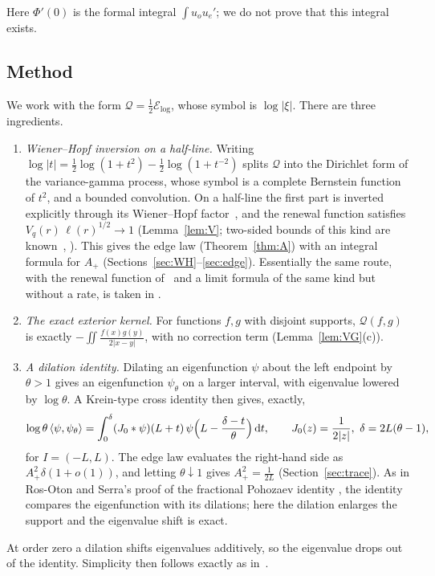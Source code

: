 \documentclass[11pt]{amsart}
\newcommand{\E}{\mathcal{E}}
\newcommand{\dd}{\,\mathrm{d}}
\theoremstyle{definition}
\theoremstyle{remark}
\numberwithin{equation}{section}
\begin{document}
Here $\Phi'(0)$ is the formal integral $\int u_ou_e'$; we do not prove that this integral exists.

\subsection{Method}
We work with the form $\mathcal Q=\frac12\E_{\log}$, whose symbol is $\log|\xi|$. There are three ingredients.
\begin{enumerate}
\item \emph{Wiener--Hopf inversion on a half-line.} Writing $\log|t|=\frac12\log(1+t^2)-\frac12\log(1+t^{-2})$ splits $\mathcal Q$ into the Dirichlet form of the variance-gamma process, whose symbol is a complete Bernstein function of $t^2$, and a bounded convolution. On a half-line the first part is inverted explicitly through its Wiener--Hopf factor~\cite{Kw11}, and the renewal function satisfies $V_q(r)\,\ell(r)^{1/2}\to1$ (Lemma~\ref{lem:V}; two-sided bounds of this kind are known~\cite[Thm.~4.4]{KMR13}, \cite[Lemma~4.1]{GR12}). This gives the edge law (Theorem~\ref{thm:A}) with an integral formula for $A_+$ (Sections~\ref{sec:WH}--\ref{sec:edge}). Essentially the same route, with the renewal function of~\cite{GR12} and a limit formula of the same kind but without a rate, is taken in \cite[\S3.3, (3.19)]{BT26}.
\item \emph{The exact exterior kernel.} For functions $f,g$ with disjoint supports, $\mathcal Q(f,g)$ is exactly $-\iint\frac{f(x)g(y)}{2|x-y|}$, with no correction term (Lemma~\ref{lem:VG}(c)).
\item \emph{A dilation identity.} Dilating an eigenfunction $\psi$ about the left endpoint by $\theta>1$ gives an eigenfunction $\psi_\theta$ on a larger interval, with eigenvalue lowered by $\log\theta$. A Krein-type cross identity then gives, exactly,
\[
\log\theta\,\langle\psi,\psi_\theta\rangle=\int_0^{\delta}(J_0*\psi)(L+t)\,\psi\Bigl(L-\frac{\delta-t}\theta\Bigr)\dd t,\qquad J_0(z)=\frac1{2|z|},\ \delta=2L(\theta-1),
\]
for $I=(-L,L)$. The edge law evaluates the right-hand side as $A_+^2\delta(1+o(1))$, and letting $\theta\downarrow1$ gives $A_+^2=\frac1{2L}$ (Section~\ref{sec:trace}). As in Ros-Oton and Serra's proof of the fractional Pohozaev identity \cite[proof of Prop.~1.6]{RS14}, the identity compares the eigenfunction with its dilations; here the dilation enlarges the support and the eigenvalue shift is exact.
\end{enumerate}
At order zero a dilation shifts eigenvalues additively, so the eigenvalue drops out of the identity. Simplicity then follows exactly as in~\cite{Kw23}.
\end{document}
